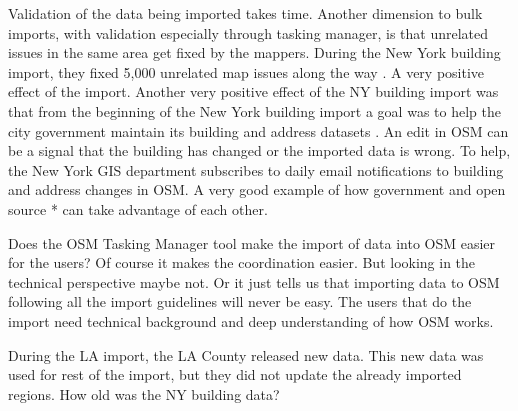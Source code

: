 Validation of the data being imported takes time. Another dimension to bulk imports, with validation especially through tasking manager, is that unrelated issues in the same area get fixed by the mappers. During the New York building import, they fixed 5,000 unrelated map issues along the way \cite{Barth2014}. A very positive effect of the import. Another very positive effect of the NY building import was that from the beginning of the New York building import a goal was to help the city government maintain its building and address datasets \cite{Barth2014b}.  An edit in OSM can be a signal that the building has changed or the imported data is wrong. To help, the New York GIS department subscribes to daily email notifications to building and address changes in OSM. A very good example of how government and open source *%
  can take advantage of each other. 

Does the OSM Tasking Manager tool make the import of data into OSM easier for the users? Of course it makes the coordination easier. But looking in the technical perspective maybe not. Or it just tells us that importing data to OSM following all the import guidelines will never be easy. The users that do the import need technical background and deep understanding of how OSM works. 

During the LA import, the LA County released new data. This new data was used for rest of the import, but they did not update the already imported regions.  %
How old was the NY building data?
